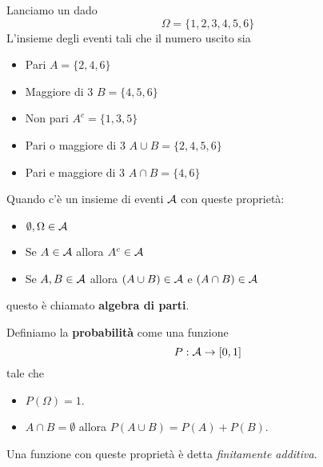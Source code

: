 \begin{example}
	Lanciamo un dado
	\[ \Omega = \{ 1, 2, 3, 4, 5, 6 \} \]
	L'insieme degli eventi tali che il numero uscito sia
	\begin{itemize}
		\item Pari $A = \{ 2, 4, 6 \}$
		\item Maggiore di 3 $B = \{ 4, 5, 6 \}$
		\item Non pari $A^c = \{ 1, 3, 5 \}$
		\item Pari o maggiore di 3 $A \cup B = \{ 2, 4, 5, 6 \}$
		\item Pari e maggiore di 3 $A \cap B = \{ 4, 6 \}$
	\end{itemize}
\end{example}

\begin{definition}
	Quando c'è un insieme di eventi $\mathcal{A}$ con queste proprietà:
	\begin{itemize}
		\item $\emptyset, \Omega \in \mathcal{A}$
		\item Se $A \in \mathcal{A}$ allora $A^c \in \mathcal{A}$
		\item Se $A, B \in \mathcal{A}$ allora $(A \cup B) \in \mathcal{A}$ e $(A \cap B) \in \mathcal{A}$
	\end{itemize}
	questo è chiamato \textbf{algebra di parti}.
\end{definition}

\begin{definition}[Provvisoria]
	Definiamo la \textbf{probabilità} come una funzione
	\[ P : \mathcal{A} \to [0, 1] \]
	tale che
	\begin{itemize}
		\item $P (\Omega) = 1$.
		\item $A \cap B = \emptyset$ allora $P(A \cup B) = P(A) + P(B)$.
	\end{itemize}
	Una funzione con queste proprietà è detta \emph{finitamente additiva}.
\end{definition}


